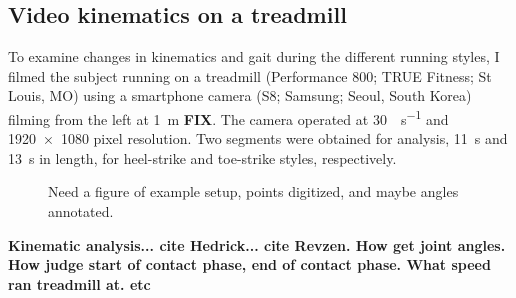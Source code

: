 \subsection{Video kinematics on a treadmill}
To examine changes in kinematics and gait during the different running styles, I filmed the subject running on a treadmill (Performance 800; TRUE Fitness; St Louis, MO) using a smartphone camera (S8; Samsung; Seoul, South Korea) filming from the left at \SI{1}{\meter} \textbf{FIX}. The camera operated at \SI{30}{\frame\per\second} and \num{1920x1080} pixel resolution. Two segments were obtained for analysis, \SI{11}{\second} and \SI{13}{\second} in length, for heel-strike and toe-strike styles, respectively.
\begin{figure}
\caption{Need a figure of example setup, points digitized, and maybe angles annotated.}
\label{fig:methods:kinematics}
\end{figure}

\textbf{Kinematic analysis... cite Hedrick... cite Revzen. How get joint angles. How judge start of contact phase, end of contact phase. What speed ran treadmill at. etc}